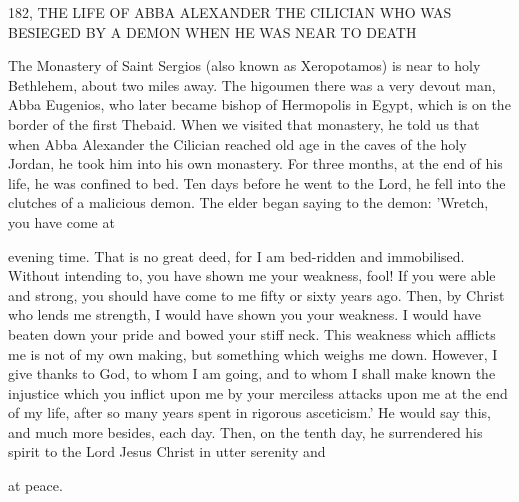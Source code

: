 182, THE LIFE OF ABBA ALEXANDER
THE CILICIAN WHO WAS BESIEGED
BY A DEMON WHEN HE WAS NEAR TO DEATH

The Monastery of Saint Sergios (also known as Xeropotamos) is
near to holy Bethlehem, about two miles away. The higoumen there
was a very devout man, Abba Eugenios, who later became bishop
of Hermopolis in Egypt, which is on the border of the first Thebaid.
When we visited that monastery, he told us that when Abba
Alexander the Cilician reached old age in the caves of the holy
Jordan, he took him into his own monastery. For three months, at
the end of his life, he was confined to bed. Ten days before he went
to the Lord, he fell into the clutches of a malicious demon. The
elder began saying to the demon: 'Wretch, you have come at

evening time. That is no great deed, for I am bed-ridden and
immobilised. Without intending to, you have shown me your
weakness, fool! If you were able and strong, you should have come
to me fifty or sixty years ago. Then, by Christ who lends me
strength, I would have shown you your weakness. I would have
beaten down your pride and bowed your stiff neck. This weakness
which afflicts me is not of my own making, but something which
weighs me down. However, I give thanks to God, to whom I am
going, and to whom I shall make known the injustice which you
inflict upon me by your merciless attacks upon me at the end of my
life, after so many years spent in rigorous asceticism.' He would say
this, and much more besides, each day. Then, on the tenth day, he
surrendered his spirit to the Lord Jesus Christ in utter serenity and

at peace.

